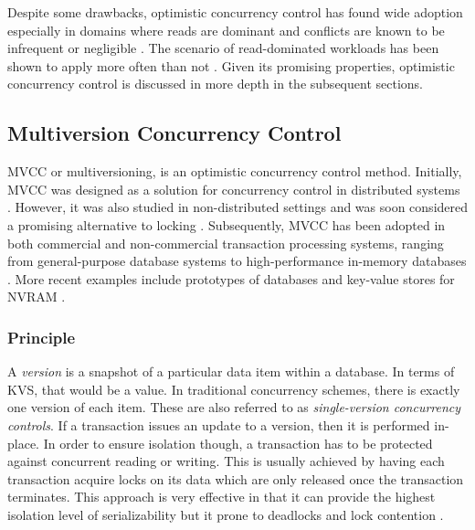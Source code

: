 Despite some drawbacks, optimistic concurrency control has found wide adoption
especially in domains where reads are dominant and conflicts are known to be
infrequent or negligible \cite{carey1986performance, larson2011high,
wu2017empirical}. The scenario of read-dominated workloads has been shown to
apply more often than not \cite{andrei2017sap, wang2017efficiently}. Given its
promising properties, optimistic concurrency control is discussed in more depth
in the subsequent sections.

\subsection{Multiversion Concurrency Control}

MVCC or multiversioning, is an optimistic concurrency control method. Initially,
MVCC was designed as a solution for concurrency control in distributed systems
\cite{reed1978naming}. However, it was also studied in non-distributed settings
and was soon considered a promising alternative to locking
\cite{kung1981optimistic, bernstein1983multiversion, carey1983multiple,
hadzilacos1986algorithmic, carey1986performance}. Subsequently, MVCC has been
adopted in both commercial and non-commercial transaction processing systems,
ranging from general-purpose database systems to high-performance in-memory
databases \cite{larson2011high, lee2013high, diaconu2013hekaton,
schwalb2015efficient}. More recent examples include prototypes of databases and
key-value stores for NVRAM \cite{bailey2013exploring, oukid2014sofort,
schwalb2016hyrise}.

\subsubsection{Principle}

A \emph{version} is a snapshot of a particular data item within a database. In
terms of KVS, that would be a value. In traditional concurrency schemes, there
is exactly one version of each item. These are also referred to as
\emph{single-version concurrency controls}. If a transaction issues an update to
a version, then it is performed in-place. In order to ensure isolation though, a
transaction has to be protected against concurrent reading or writing. This is
usually achieved by having each transaction acquire locks on its data which are
only released once the transaction terminates. This approach is very effective
in that it can provide the highest isolation level of serializability but it
prone to deadlocks and lock contention \cite{berenson1995critique}.

